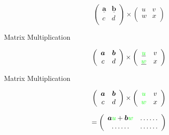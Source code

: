 \documentclass[]{report}
\begin{document}
{{{{			\[ \left(
			\begin{array}{cc}
			\underline{\boldsymbol{a}}& \underline{\boldsymbol{b}} \\
			c & d \\
			\end{array}
			\right) \times \left(
			\begin{array}{cc}
			u & v \\
			w & x \\
			\end{array}
			\right)
			\]
			
			{
				{Matrix Multiplication}
				
				{\huge
				
						\[ \left(
						\begin{array}{cc}
						\boldsymbol{a} & \boldsymbol{b} \\
						c & d \\
						\end{array}
						\right) \times \left(
						\begin{array}{cc}
						\underline{\textcolor{green}{u}} & v \\
						\underline{\textcolor{green}{w}} & x \\
						\end{array}
						\right)
						\]
						
						
						{Matrix Multiplication}
						
						{\huge
							
							\[ \left(
							\begin{array}{cc}
							\boldsymbol{a} & \boldsymbol{b} \\
							c & d \\
							\end{array}
							\right) \times \left(
							\begin{array}{cc}
							\textcolor{green}{u} & v \\
							\textcolor{green}{w} & x \\
							\end{array}
							\right)
							\]
							
							\[ = \left(
							\begin{array}{cc}
							\boldsymbol{a}\textcolor{green}{u} + \boldsymbol{b}\textcolor{green}{w}& \ldots \ldots\\
							\ldots \ldots & \ldots \ldots \\
							\end{array}
							\right) 
							\]
							
}}}}}}}
\end{document}
